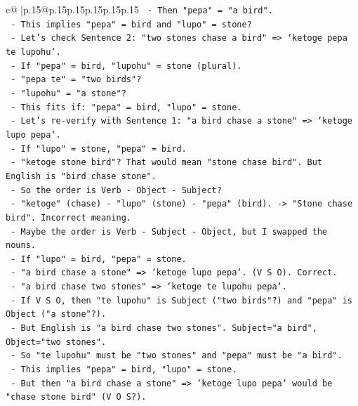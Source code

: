 \documentclass{article}
\begin{document}
{\begin{supertabular}{c@{$\;$}|p{.15\linewidth}@{}p{.15\linewidth}p{.15\linewidth}p{.15\linewidth}p{.15\linewidth}p{.15\linewidth}}
{{{\texttt{       {-} Then "pepa" = "a bird".} \\
\texttt{       {-} This implies "pepa" = bird and "lupo" = stone?} \\
\texttt{       {-} Let's check Sentence 2: "two stones chase a bird" => `ketoge pepa te lupohu`.} \\
\texttt{         {-} If "pepa" = bird, "lupohu" = stone (plural).} \\
\texttt{         {-} "pepa te" = "two birds"?} \\
\texttt{         {-} "lupohu" = "a stone"?} \\
\texttt{         {-} This fits if: "pepa" = bird, "lupo" = stone.} \\
\texttt{         {-} Let's re{-}verify with Sentence 1: "a bird chase a stone" => `ketoge lupo pepa`.} \\
\texttt{           {-} If "lupo" = stone, "pepa" = bird.} \\
\texttt{           {-} "ketoge stone bird"? That would mean "stone chase bird". But English is "bird chase stone".} \\
\texttt{           {-} So the order is Verb {-} Object {-} Subject?} \\
\texttt{           {-} "ketoge" (chase) {-} "lupo" (stone) {-} "pepa" (bird). {-}> "Stone chase bird". Incorrect meaning.} \\
\texttt{           {-} Maybe the order is Verb {-} Subject {-} Object, but I swapped the nouns.} \\
\texttt{           {-} If "lupo" = bird, "pepa" = stone.} \\
\texttt{           {-} "a bird chase a stone" => `ketoge lupo pepa`. (V S O). Correct.} \\
\texttt{           {-} "a bird chase two stones" => `ketoge te lupohu pepa`.} \\
\texttt{             {-} If V S O, then "te lupohu" is Subject ("two birds"?) and "pepa" is Object ("a stone"?).} \\
\texttt{             {-} But English is "a bird chase two stones". Subject="a bird", Object="two stones".} \\
\texttt{             {-} So "te lupohu" must be "two stones" and "pepa" must be "a bird".} \\
\texttt{             {-} This implies "pepa" = bird, "lupo" = stone.} \\
\texttt{             {-} But then "a bird chase a stone" => `ketoge lupo pepa` would be "chase stone bird" (V O S?).} \\
}}}
\end{supertabular}}
\end{document}
